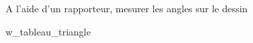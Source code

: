 \begin{exo}
    A l'aide d'un rapporteur, mesurer les angles sur le dessin 
\end{exo}

    {w_tableau_triangle}

\newpage